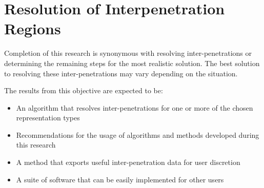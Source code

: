 \section{Resolution of Interpenetration Regions}

Completion of this research is synonymous with resolving inter-penetrations or determining the remaining steps for the most realistic solution. The best solution to resolving these inter-penetrations may vary depending on the situation.

The results from this objective are expected to be:
\begin{itemize}
	\item An algorithm that resolves inter-penetrations for one or more of the chosen representation types
	\item Recommendations for the usage of algorithms and methods developed during this research
	\item A method that exports useful inter-penetration data for user discretion
	\item A suite of software that can be easily implemented for other users
\end{itemize}

